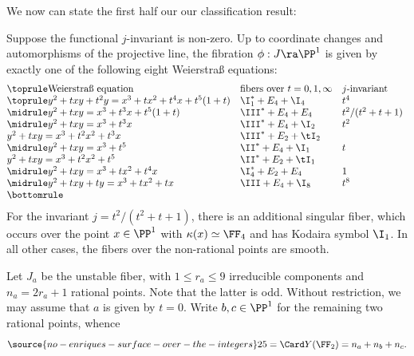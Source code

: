 We now can state the first half our our classification result:

\begin{theorem}
\notready
\label{classification non-zero j}
Suppose the functional $j$-invariant is non-zero.
Up to coordinate changes and automorphisms of the projective line,
the fibration $\phi:J\ra\PP^1$ is given by exactly one of the following eight Weierstra\ss{} equations:
$$
\begin{array}[c]{@{}lll}
\toprule
\text{\rm Weierstra\ss{} equation}      & \text{\rm fibers over $t=0,1,\infty$}	& \text{\rm $j$-invariant}\\
\toprule
y^2+txy+t^2y=x^3+ tx^2+t^4x+t^5(1+t)    & \I_1^*+E_4+\I_4                       & t^4\\
\midrule
y^2+txy=x^3+t^3x+t^5(1+t)               & \III^*+E_4+E_4                        & t^2/(t^2+t+1)\\
\midrule
y^2+txy=x^3+t^3x 			            & \III^*+E_4+\I_2                       & t^2\\
y^2+txy=x^3+t^2x^2+t^3x                 & \III^*+E_2+\tI_2\\
\midrule
y^2+txy=x^3+t^5                         & \II^*+E_4+\I_1                        & t\\
y^2+txy=x^3+t^2x^2+t^5                  & \II^*+E_2+\tI_1\\
\midrule
y^2+txy=x^3+tx^2+t^4x                   & \I_4^* +E_2+E_4                       & 1\\
\midrule
y^2+txy+ty=x^3+tx^2+tx                     & \III+E_4+\I_8                         & t^8\\
\bottomrule
\end{array}
$$
For the invariant $j=t^2/(t^2+t+1)$, there is an additional singular fiber, which occurs over the point $x\in\PP^1$ with $\kappa(x)\simeq\FF_4$
and has Kodaira symbol $\I_1$.
In all other cases, the fibers over the non-rational points are smooth.
\end{theorem}

\proof
Let $J_a$ be the unstable fiber, with $1\leq r_a\leq 9$ irreducible components and $n_a=2r_a+1$ rational points.
Note that the latter is odd.
Without restriction, we may assume that $a$ is given by $t=0$. Write $b,c\in\PP^1$ for the remaining two rational points,
whence
\begin{equation}
\label{cardinality}
\source{no-enriques-surface-over-the-integers}
25=\Card Y(\FF_2) = n_a+n_b+n_c.
\end{equation}

